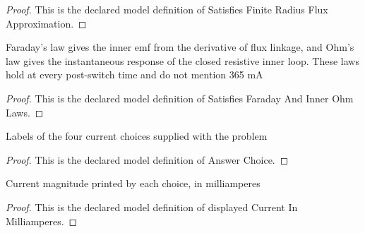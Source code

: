 \begin{proof}
  This is the declared model definition of Satisfies Finite Radius Flux Approximation.
\end{proof}
\begin{definition}
  \label{def:physics:phyx-mini-0978:phyxminiproblems-problemphyxmini0978-satisfiesfaradayandinnerohmlaws}
  Faraday's law gives the inner emf from the derivative of flux linkage, and Ohm's law gives the instantaneous response of the closed resistive inner loop. These laws hold at every post-switch time and do not mention 365 mA
\end{definition}
\begin{proof}
  This is the declared model definition of Satisfies Faraday And Inner Ohm Laws.
\end{proof}
\begin{definition}
  \label{def:physics:phyx-mini-0978:phyxminiproblems-problemphyxmini0978-answerchoice}
  Labels of the four current choices supplied with the problem
\end{definition}
\begin{proof}
  This is the declared model definition of Answer Choice.
\end{proof}
\begin{definition}
  \label{def:physics:phyx-mini-0978:phyxminiproblems-problemphyxmini0978-answerchoice-displayedcurrentinmilliamperes}
  Current magnitude printed by each choice, in milliamperes
\end{definition}
\begin{proof}
  This is the declared model definition of displayed Current In Milliamperes.
\end{proof}

